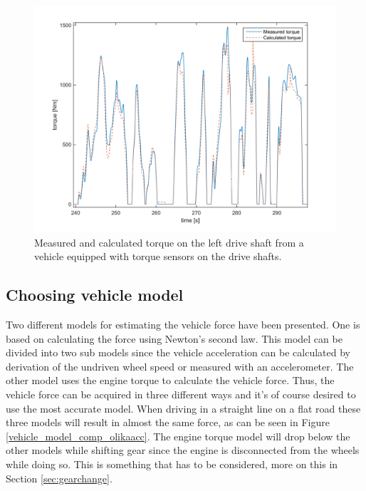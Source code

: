 \begin{figure}[h]
	\centering
	\includegraphics[width=1\textwidth]{Pictures/torque_ver}
	\caption{Measured and calculated torque on the left drive shaft from a vehicle equipped with torque sensors on the drive shafts.}
	\label{torque_ver}
\end{figure}

\subsection{Choosing vehicle model}
Two different models for estimating the vehicle force have been presented. One is based on calculating the force using Newton's second law. This model can be divided into two sub models since the vehicle acceleration can be calculated by derivation of the undriven wheel speed or measured with an accelerometer. The other model uses the engine torque to calculate the vehicle force. Thus, the vehicle force can be acquired in three different ways and it's of course desired to use the most accurate model. When driving in a straight line on a flat road these three models will result in almost the same force, as can be seen in Figure \ref{vehicle_model_comp_olikaacc}. The engine torque model will drop below the other models while shifting gear since the engine is disconnected from the wheels while doing so. This is something that has to be considered, more on this in Section \ref{sec:gearchange}.

